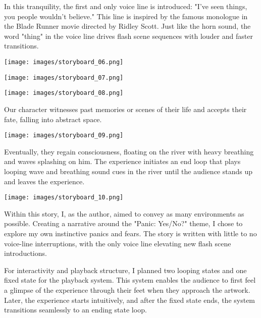         In this tranquility, the first and only voice line is introduced: "I've seen things, you people wouldn't believe." This line is inspired by the famous monologue in the Blade Runner movie directed by Ridley Scott. Just like the horn sound, the word "thing" in the voice line drives flash scene sequences with louder and faster transitions.\par

        \begin{center}
            \texttt{[image: images/storyboard\_06.png]}
        \end{center}

        \begin{center}
            \texttt{[image: images/storyboard\_07.png]}
        \end{center}

        \begin{center}
            \texttt{[image: images/storyboard\_08.png]}
        \end{center}

        Our character witnesses past memories or scenes of their life and accepts their fate, falling into abstract space.\par

        \begin{center}
            \texttt{[image: images/storyboard\_09.png]}
        \end{center}

        Eventually, they regain consciousness, floating on the river with heavy breathing and waves splashing on him. The experience initiates an end loop that plays looping wave and breathing sound cues in the river until the audience stands up and leaves the experience.\par

        \begin{center}
            \texttt{[image: images/storyboard\_10.png]}
        \end{center}

        Within this story, I, as the author, aimed to convey as many environments as possible. Creating a narrative around the "Panic: Yes/No?" theme, I chose to explore my own instinctive panics and fears. The story is written with little to no voice-line interruptions, with the only voice line elevating new flash scene introductions.\par

        For interactivity and playback structure, I planned two looping states and one fixed state for the playback system. This system enables the audience to first feel a glimpse of the experience through their feet when they approach the artwork. Later, the experience starts intuitively, and after the fixed state ends, the system transitions seamlessly to an ending state loop.\par